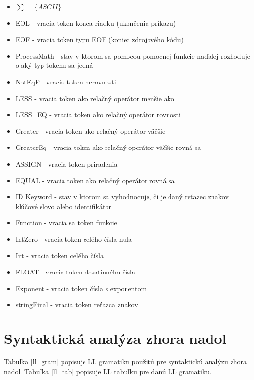 \documentclass[a4paper, 11pt]{article}
\begin{document}
\begin{itemize}
\item $\sum = \{ASCII\}$
\item EOL - vracia token konca riadku (ukončenia príkazu)
\item EOF - vracia token typu EOF (koniec zdrojového kódu)
\item ProcessMath - stav v ktorom sa pomocou pomocnej funkcie naďalej rozhoduje o aký typ tokenu sa jedná
\item NotEqF - vracia token nerovnosti 
\item LESS - vracia token ako relačný operátor menšie ako
\item LESS\_EQ - vracia token ako relačný operátor rovnosti
\item Greater - vracia token ako relačný operátor väčšie
\item GreaterEq - vracia token ako relačný operátor väčšie rovná sa
\item ASSIGN - vracia token priradenia
\item EQUAL - vracia token ako relačný operátor rovná sa
\item ID Keyword - stav v ktorom sa vyhodnocuje, či je daný reťazec znakov kľúčové slovo alebo identifikátor
\item Function - vracia sa token funkcie
\item IntZero - vracia token celého čísla nula
\item Int - vracia token celého čísla 
\item FLOAT - vracia token desatinného čísla
\item Exponent - vracia token čísla s exponentom
\item stringFinal - vracia token reťazca znakov

\end{itemize}
\newpage

\section{Syntaktická analýza zhora nadol}
Tabuľka \ref{ll_gram} popisuje LL gramatiku použitú pre syntaktickú analýzu zhora nadol. Tabuľka \ref{ll_tab} popisuje LL tabuľku pre danú LL gramatiku.
\end{document}
